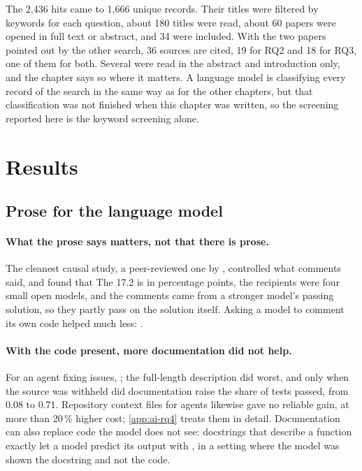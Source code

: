 The 2,436 hits came to 1,666 unique records.
Their titles were filtered by keywords for each question, about 180 titles were
read, about 60 papers were opened in full text or abstract, and 34 were
included.
With the two papers pointed out by the other search, 36 sources are cited, 19
for RQ2 and 18 for RQ3, one of them for both.
Several were read in the abstract and introduction only, and the chapter says
so where it matters.
A language model is classifying every record of the search in the same way as
for the other chapters, but that classification was not finished when this
chapter was written, so the screening reported here is the keyword screening
alone.

\section{Results}
\label{sec:ai-rq23-results}

\subsection{Prose for the language model}

\paragraph{What the prose says matters, not that there is prose.}
The cleanest causal study, a peer-reviewed one by \textcite{pan2026talking},
controlled what comments said, and found that
The 17.2 is in percentage points, the recipients were four small open models,
and the comments came from a stronger model's passing solution, so they partly
pass on the solution itself.
Asking a model to comment its own code helped much less:
.

\paragraph{With the code present, more documentation did not help.}
For an agent fixing issues, ; the full-length description did worst, and only when
the source was withheld did documentation raise the share of tests passed, from
0.08 to 0.71.
Repository context files for agents likewise gave no reliable gain, at more
than 20\,\% higher cost\autocite{gloaguen2026agentsmd}; \cref{app:ai-rq4}
treats them in detail.
Documentation can also replace code the model does not see: docstrings that
describe a function exactly let a model predict its output with
, in a setting where the model was shown the docstring and
not the code.

